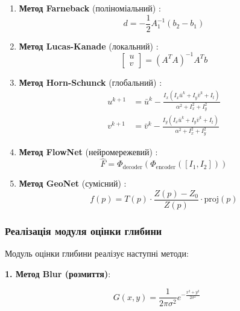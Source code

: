 \documentclass[14pt, a4paper]{extarticle}
\numberwithin{equation}{section}
\begin{document}
\begin{enumerate}
    \item \textbf{Метод Farneback} (поліноміальний) \cite{farneback2003two}:
    \begin{equation}
    d = -\frac{1}{2} A_1^{-1} (b_2 - b_1) \tag{4.9}
    \end{equation}
    
    \item \textbf{Метод Lucas-Kanade} (локальний) \cite{lucas1981iterative}:
    \begin{equation}
    \begin{bmatrix} u \\ v \end{bmatrix} = (A^T A)^{-1} A^T b \tag{4.10}
    \end{equation}
    
    \item \textbf{Метод Horn-Schunck} (глобальний) \cite{horn1981determining}:
    \begin{align}
    u^{k+1} &= \bar{u}^k - \frac{I_x (I_x \bar{u}^k + I_y \bar{v}^k + I_t)}{\alpha^2 + I_x^2 + I_y^2} \tag{4.11} \\
    v^{k+1} &= \bar{v}^k - \frac{I_y (I_x \bar{u}^k + I_y \bar{v}^k + I_t)}{\alpha^2 + I_x^2 + I_y^2} \tag{4.12}
    \end{align}
    
    \item \textbf{Метод FlowNet} (нейромережевий) \cite{dosovitskiy2015flownet}:
    \begin{equation}
    \hat{F} = \Phi_{\text{decoder}}(\Phi_{\text{encoder}}([I_1, I_2])) \tag{4.13}
    \end{equation}
    
    \item \textbf{Метод GeoNet} (сумісний) \cite{yin2019geonet}:
    \begin{equation}
    f(p) = T(p) \cdot \frac{Z(p) - Z_0}{Z(p)} \cdot \text{proj}(p) \tag{4.14}
    \end{equation}
\end{enumerate}

\subsubsection{Реалізація модуля оцінки глибини}

Модуль оцінки глибини реалізує наступні методи:

\textbf{1. Метод Blur (розмиття)}:

\begin{equation}
G(x,y) = \frac{1}{2\pi\sigma^2} e^{-\frac{x^2+y^2}{2\sigma^2}} \tag{4.15}
\end{equation}
\end{document}
